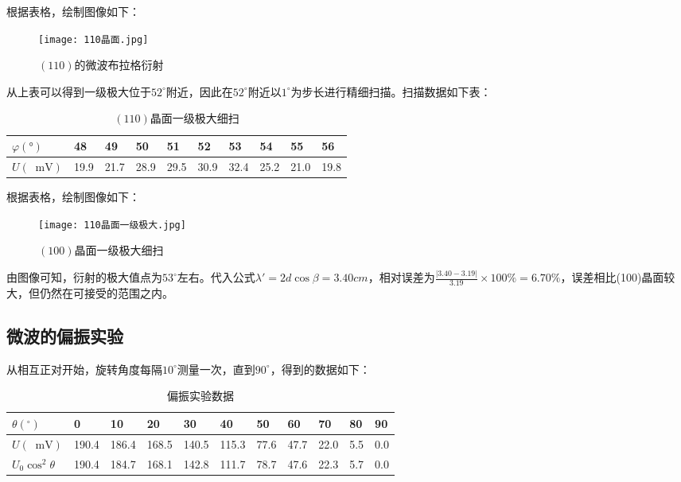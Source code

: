 \documentclass[11pt]{article}
\newcommand*{\unit}[1]{\mathop{}\!\mathrm{#1}}
\begin{document}
根据表格，绘制图像如下：

\begin{figure}[H]
  \centering
  \texttt{[image: 110晶面.jpg]}
  \caption{$(110)$的微波布拉格衍射}
\end{figure}

从上表可以得到一级极大位于$52^\circ$附近，因此在$52^\circ$附近以$1^\circ$为步长进行精细扫描。扫描数据如下表：

\begin{table}[H]
	\centering 
	\begin{tabular}{|l|l|l|l|l|l|l|l|l|l|}
		\hline
		$\varphi(°)$ &48    & 49    & 50    & 51    & 52    & 53    & 54    & 55    & 56  \\ \hline
		$U(\unit{mV})$&19.9  & 21.7  & 28.9  & 29.5  & 30.9  & 32.4  & 25.2  & 21.0  & 19.8   \\ \hline
	\end{tabular}
  \caption{$(110)$晶面一级极大细扫}
\end{table}

根据表格，绘制图像如下：

\begin{figure}[H]
  \centering
  \texttt{[image: 110晶面一级极大.jpg]}
  \caption{$(100)$晶面一级极大细扫}
\end{figure}

由图像可知，衍射的极大值点为$53^\circ$左右。代入公式$\lambda'=2d\cos \beta = 3.40 cm$，相对误差为$\frac{|3.40-3.19|}{3.19} \times 100\% = 6.70\%$，误差相比(100)晶面较大，但仍然在可接受的范围之内。

\subsection{微波的偏振实验}

从相互正对开始，旋转角度每隔$10^\circ$测量一次，直到$90^\circ$，得到的数据如下：

\begin{table}[H]
  \centering
  \begin{tabular}{|l|l|l|l|l|l|l|l|l|l|l|}
    \hline
    $\theta(^\circ)$ & 0    & 10   & 20   & 30   & 40   & 50   & 60   & 70   & 80  & 90 \\ \hline
    $U(\unit{mV})$ & 190.4  & 186.4  & 168.5  & 140.5  & 115.3  & 77.6  & 47.7  & 22.0  & 5.5   & 0.0\\ \hline
    $U_0 \cos^2{\theta}$ & 190.4  & 184.7  & 168.1  & 142.8  & 111.7  & 78.7  & 47.6  & 22.3  & 5.7   & 0.0  \\ \hline
    \end{tabular}
    \caption{偏振实验数据}
\end{table}
\end{document}
